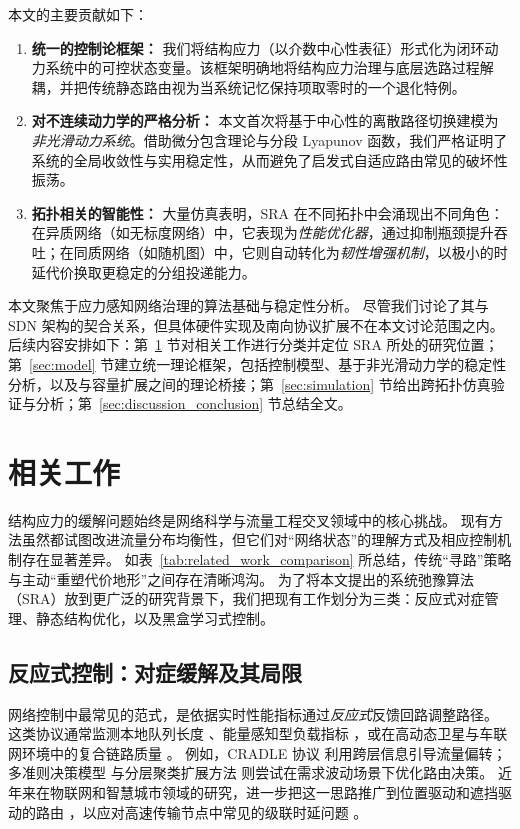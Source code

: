 \documentclass[journal]{IEEEtran}
\theoremstyle{plain}
\theoremstyle{definition}
\begin{document}
本文的主要贡献如下：
\begin{enumerate}
    \item \textbf{统一的控制论框架：} 我们将结构应力（以介数中心性表征）形式化为闭环动力系统中的可控状态变量。该框架明确地将结构应力治理与底层选路过程解耦，并把传统静态路由视为当系统记忆保持项取零时的一个退化特例。
    \item \textbf{对不连续动力学的严格分析：} 本文首次将基于中心性的离散路径切换建模为\textit{非光滑动力系统}。借助微分包含理论与分段 Lyapunov 函数，我们严格证明了系统的全局收敛性与实用稳定性，从而避免了启发式自适应路由常见的破坏性振荡。
    \item \textbf{拓扑相关的智能性：} 大量仿真表明，SRA 在不同拓扑中会涌现出不同角色：在异质网络（如无标度网络）中，它表现为\textit{性能优化器}，通过抑制瓶颈提升吞吐；在同质网络（如随机图）中，它则自动转化为\textit{韧性增强机制}，以极小的时延代价换取更稳定的分组投递能力。
\end{enumerate}

本文聚焦于应力感知网络治理的算法基础与稳定性分析。
尽管我们讨论了其与 SDN 架构的契合关系，但具体硬件实现及南向协议扩展不在本文讨论范围之内。
后续内容安排如下：第~\ref{sec:related_work} 节对相关工作进行分类并定位 SRA 所处的研究位置；第~\ref{sec:model} 节建立统一理论框架，包括控制模型、基于非光滑动力学的稳定性分析，以及与容量扩展之间的理论桥接；第~\ref{sec:simulation} 节给出跨拓扑仿真验证与分析；第~\ref{sec:discussion_conclusion} 节总结全文。

\section{相关工作}
\label{sec:related_work}

结构应力的缓解问题始终是网络科学与流量工程交叉领域中的核心挑战。
现有方法虽然都试图改进流量分布均衡性，但它们对“网络状态”的理解方式及相应控制机制存在显著差异。
如表~\ref{tab:related_work_comparison} 所总结，传统“寻路”策略与主动“重塑代价地形”之间存在清晰鸿沟。
为了将本文提出的系统弛豫算法（SRA）放到更广泛的研究背景下，我们把现有工作划分为三类：反应式对症管理、静态结构优化，以及黑盒学习式控制。

\subsection{反应式控制：对症缓解及其局限}

网络控制中最常见的范式，是依据实时性能指标通过\textit{反应式}反馈回路调整路径。
这类协议通常监测本地队列长度 \cite{Macabale2020Cradle}、能量感知型负载指标 \cite{SM2025Novel}，或在高动态卫星与车联网环境中的复合链路质量 \cite{Wang2025VANET, Fu2024SatelliteBC}。
例如，CRADLE 协议 \cite{Macabale2020Cradle} 利用跨层信息引导流量偏转；多准则决策模型 \cite{Fouad2014MultiCriteria} 与分层聚类扩展方法 \cite{Guizani2011Hierarchical} 则尝试在需求波动场景下优化路由决策。
近年来在物联网和智慧城市领域的研究，进一步把这一思路推广到位置驱动和遮挡驱动的路由 \cite{Darabkh2025SmartCity, Aditya2020ClosenessCluster}，以应对高速传输节点中常见的级联时延问题 \cite{Wu2024RailwayNode}。
\end{document}
